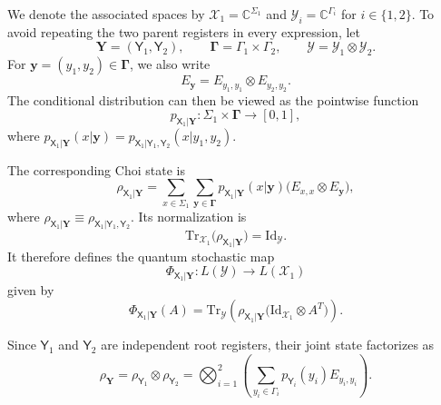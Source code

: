 \documentclass[
    aps,
    pra,
    reprint,
    superscriptaddress,
    nofootinbib
]{revtex4-2}
\theoremstyle{definition}
\theoremstyle{plain}
\begin{document}
We denote the associated spaces by
$\mathcal{X}_{1}=\mathbb{C}^{\Sigma_{1}}$ and
$\mathcal{Y}_{i}=\mathbb{C}^{\Gamma_{i}}$ for $i\in\{1,2\}$. To avoid
repeating the two parent registers in every expression, let
\begin{equation}
    \mathbf{Y}=(\mathsf{Y}_{1},\mathsf{Y}_{2}),
    \qquad
    \boldsymbol{\Gamma}=\Gamma_{1}\times\Gamma_{2},
    \qquad
    \mathcal{Y}=\mathcal{Y}_{1}\otimes\mathcal{Y}_{2}.
\end{equation}
For $\mathbf{y}=(y_{1},y_{2})\in\boldsymbol{\Gamma}$, we also write
\begin{equation}
    E_{\mathbf{y}}
    =
    E_{y_{1},y_{1}}\otimes E_{y_{2},y_{2}}.
\end{equation}
The conditional distribution can then be viewed as the pointwise function
\begin{equation}
    p_{\mathsf{X}_{1}|\mathbf{Y}}:
    \Sigma_{1}\times\boldsymbol{\Gamma}
    \to[0,1],
\end{equation}
where
$p_{\mathsf{X}_{1}|\mathbf{Y}}(x|\mathbf{y})
=p_{\mathsf{X}_{1}|\mathsf{Y}_{1},\mathsf{Y}_{2}}
(x|y_{1},y_{2})$.

The corresponding Choi state is
\begin{equation}
    \rho_{\mathsf{X}_{1}|\mathbf{Y}}
    =
    \sum_{x\in\Sigma_{1}}
    \sum_{\mathbf{y}\in\boldsymbol{\Gamma}}
    p_{\mathsf{X}_{1}|\mathbf{Y}}(x|\mathbf{y})
    \bigl(E_{x,x}\otimes E_{\mathbf{y}}\bigr),
\end{equation}
where
$\rho_{\mathsf{X}_{1}|\mathbf{Y}}
\equiv
\rho_{\mathsf{X}_{1}|\mathsf{Y}_{1},\mathsf{Y}_{2}}$.
Its normalization is
\begin{equation}
    \mathrm{Tr}_{\mathcal{X}_{1}}
    \bigl(\rho_{\mathsf{X}_{1}|\mathbf{Y}}\bigr)
    =
    \mathrm{Id}_{\mathcal{Y}}.
\end{equation}
It therefore defines the quantum stochastic map
\begin{equation}
    \Phi_{\mathsf{X}_{1}|\mathbf{Y}}:
    L(\mathcal{Y})
    \to
    L(\mathcal{X}_{1})
\end{equation}
given by
\begin{equation}
    \Phi_{\mathsf{X}_{1}|\mathbf{Y}}(A)
    =
    \mathrm{Tr}_{\mathcal{Y}}
    \left(
        \rho_{\mathsf{X}_{1}|\mathbf{Y}}
        \bigl(
            \mathrm{Id}_{\mathcal{X}_{1}}\otimes A^{T}
        \bigr)
    \right).
\end{equation}

Since $\mathsf{Y}_{1}$ and $\mathsf{Y}_{2}$ are independent root
registers, their joint state factorizes as
\begin{equation}
    \rho_{\mathbf{Y}}
    =
    \rho_{\mathsf{Y}_{1}}\otimes\rho_{\mathsf{Y}_{2}}
    =
    \bigotimes_{i=1}^{2}
    \left(
        \sum_{y_{i}\in\Gamma_{i}}
        p_{\mathsf{Y}_{i}}(y_{i})E_{y_{i},y_{i}}
    \right).
\end{equation}
\end{document}
